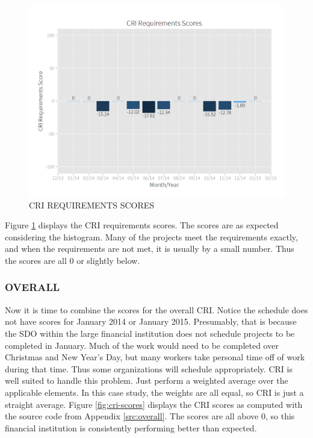 \documentclass[SDSUThesis.tex]{subfiles}
\begin{document}
            \begin{figure}[ht]
                \centering
                \includegraphics[scale=.3]{images/requirements_scores.png}
                \caption{CRI REQUIREMENTS SCORES}
                \label{fig:requirements-scores}
            \end{figure}
            
            Figure \ref{fig:requirements-scores} displays the CRI requirements
            scores. The scores are as expected considering the histogram. Many
            of the projects meet the requirements exactly, and when the requirements
            are not met, it is usually by a small number.
            Thus the scores are all 0 or slightly below.
            
        \subsubsection{OVERALL}
            Now it is time to combine the scores for the overall CRI.  Notice
            the schedule does not have scores for January 2014 or January 2015.
            Presumably, that is because the SDO within the large financial institution
            does not schedule projects to be completed in January. Much of the work
            would need to be completed over Christmas and New Year's Day, but many
            workers take personal time off of work during that time.  Thus some
            organizations will schedule appropriately.  CRI is well suited to
            handle this problem.  Just perform a weighted average over the
            applicable elements.  In this case study, the weights are all equal,
            so CRI is just a straight average.  Figure \ref{fig:cri-scores}
            displays the CRI scores as computed with the source code
            from Appendix \ref{src:overall}.  The scores are all above 0, so this
            financial institution is consistently performing better
            than expected.  
            
\end{document}
